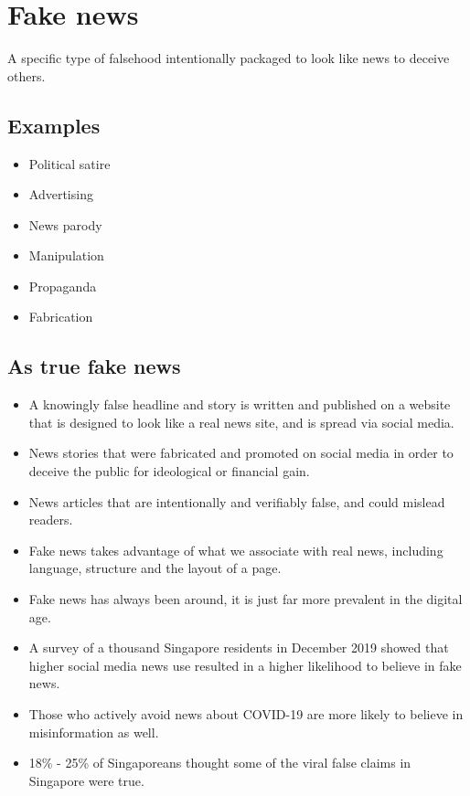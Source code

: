 \documentclass[11pt]{article}
\begin{document}
 \newpage

\section{Fake news}
\label{sec:org835d8f7}
A specific type of falsehood intentionally packaged to look like news to deceive others.

\subsection{Examples}
\label{sec:org686b8df}
\begin{itemize}
\item Political satire
\item Advertising
\item News parody
\item Manipulation
\item Propaganda
\item Fabrication
\end{itemize}

\subsection{As true fake news}
\label{sec:orgeb37f3b}
\begin{itemize}
\item A knowingly false headline and story is written and published on a website that is designed to look like a real news site, and is spread via social media.
\item News stories that were fabricated and promoted on social media in order to deceive the public for ideological or financial gain.
\item News articles that are intentionally and verifiably false, and could mislead readers.
\item Fake news takes advantage of what we associate with real news, including language, structure and the layout of a page.
\item Fake news has always been around, it is just far more prevalent in the digital age.
\item A survey of a thousand Singapore residents in December 2019 showed that higher social media news use resulted in a higher likelihood to believe in fake news.
\item Those who actively avoid news about COVID-19 are more likely to believe in misinformation as well.
\item 18\% - 25\% of Singaporeans thought some of the viral false claims in Singapore were true.
\end{itemize}
\end{document}

